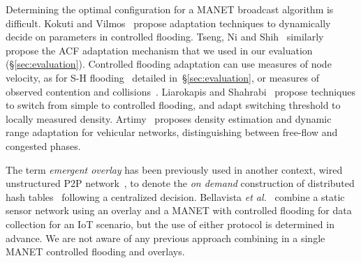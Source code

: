 Determining the optimal configuration for a MANET broadcast algorithm is difficult.
Kokuti and Vilmos~\cite{kokuti2012adaptive} propose adaptation techniques to dynamically decide on parameters in controlled flooding.
Tseng, Ni and Shih~\cite{2001:AAR:876878.879323} similarly propose the ACF adaptation mechanism that we used in our evaluation (\S\ref{sec:evaluation}).
Controlled flooding adaptation can use measures of node velocity, as for S-H flooding~\cite{adaptive_group_com_iscc02} detailed in~\S\ref{sec:evaluation}, or measures of observed contention and collisions~\cite{2001:AAR:876878.879323}.
Liarokapis and Shahrabi~\cite{prob-based-adaptive-tech} propose techniques to switch from simple to controlled flooding, and adapt switching threshold to locally measured density.
Artimy~\cite{artimy2007local} proposes density estimation and dynamic range adaptation for vehicular networks, distinguishing between free-flow and congested phases.

The term \emph{emergent overlay} has been previously used in another context, wired unstructured P2P network~\cite{galuba2007generic}, to denote the \emph{on demand} construction of distributed hash tables~\cite{jelasity2009t} following a centralized decision.
Bellavista \emph{et al.}~\cite{Bellavista2013} combine a static sensor network using an overlay and a MANET with controlled flooding for data collection for an IoT scenario, but the use of either protocol is determined in advance.
We are not aware of any previous approach combining in a single MANET controlled flooding and overlays.


